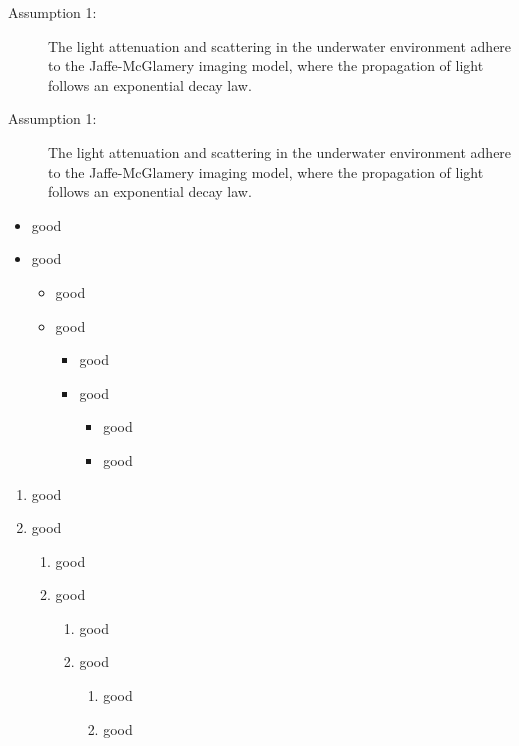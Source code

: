 \begin{description}
	\item[Assumption 1:] The light attenuation and scattering in the underwater environment adhere to the Jaffe-McGlamery imaging model, where the propagation of light follows an exponential decay law.
	\item[Assumption 1:] The light attenuation and scattering in the underwater environment adhere to the Jaffe-McGlamery imaging model, where the propagation of light follows an exponential decay law.
\end{description}











\begin{itemize}
	\item good
	\item good
	\begin{itemize}
		\item good
		\item good
			\begin{itemize}
			\item good
			\item good
			\begin{itemize}
				\item good
				\item good
			\end{itemize}
		   \end{itemize}
	\end{itemize}
\end{itemize}



\begin{enumerate}
	\item good
	\item good
	\begin{enumerate}
		\item good
		\item good
		\begin{enumerate}
			\item good
			\item good
			\begin{enumerate}
				\item good
				\item good				
			\end{enumerate}
		\end{enumerate}
	\end{enumerate}
\end{enumerate}


















